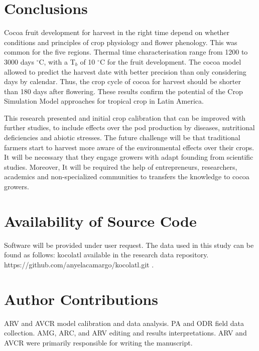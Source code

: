 \documentclass[gene,journal,article,submit,moreauthors,pdftex]{Definitions/mdpi}
\begin{document}
\section{Conclusions}

Cocoa fruit development for harvest in the right time depend on whether conditions and principles of crop physiology and flower phenology.  This was common for the five regions. Thermal time characterisation range from 1200 to 3000 days $^\circ$C, with a T$_{b}$ of 10 $^\circ$C for the fruit development.  The cocoa model allowed to predict the harvest date with better precision than only considering days by calendar. Thus, the crop cycle of cocoa for harvest  should be shorter than 180 days after flowering. These results confirm the potential of the Crop Simulation Model approaches  for tropical crop in Latin America.

This research presented and initial crop calibration that can be improved with further studies, to include effects over the pod production by diseases, nutritional deficiencies and abiotic stresses. The future challenge will be that traditional farmers start to harvest more aware of the environmental effects over their crops. It will be necessary that they engage growers with adapt founding from scientific studies. Moreover, It will be required the help of entrepreneurs, researchers, academics and non-specialized communities to transfers the knowledge to cocoa growers.

\section{Availability of Source Code}
Software will be provided under user request. The data used in this study can be found as follows: kocolatl available in the  research data repository.\\ https://github.com/anyelacamargo/kocolatl.git .

\section{Author Contributions}
ARV and AVCR model calibration and data analysis. PA and ODR field data collection. AMG, ARC, and ARV editing and results interpretations. ARV and AVCR were primarily responsible for writing the manuscript.

\end{document}
